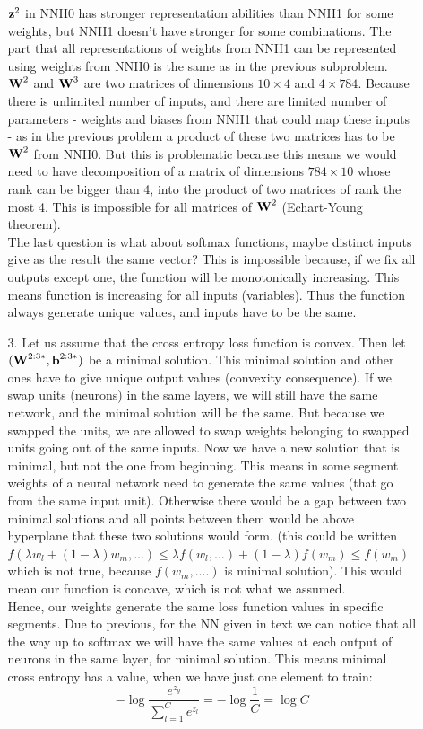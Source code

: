 \documentclass[10pt,a4paper]{article}
\begin{document}
\begin{enumerate}
\begin{enumerate}
$\textbf{\text{{z}}}^2$ in  NNH0 has stronger representation abilities than NNH1 for some weights, but NNH1 doesn't have stronger for some combinations. The part that all representations of weights from NNH1 can be represented using weights from NNH0 is the same as in the previous subproblem.\\
$\textbf{\text{{W}}}^2$ and $\textbf{\text{{W}}}^3$ are two matrices of dimensions $10\times 4$ and $4 \times 784$. Because there is unlimited number of inputs, and there  are limited number of parameters - weights and biases from NNH1 that could map these inputs - as in the previous problem a product of these two matrices has to be $\textbf{\text{{W}}}^2$ from NNH0. But this is problematic because this means we would need to have decomposition of a matrix of dimensions $784\times10$ whose rank can be bigger than 4, into the product of two matrices of rank the most 4. This is impossible for all matrices of $\textbf{\text{{W}}}^2$ (Echart-Young theorem).
\\ The last question is what about softmax functions, maybe distinct inputs give as the result the same vector? This is impossible because, if we fix all outputs except one, the function will be monotonically increasing. This means function is increasing for all inputs (variables). Thus the function always generate unique values, and inputs have to be the same.   
\item[3.]
Let us assume that the cross entropy loss function is convex. Then let $(\textbf{\text{{W}}}^{2:3*}, \textbf{\text{{b}}}^{2:3*})$ be a minimal solution. This minimal solution and other ones have to give unique output values (convexity consequence). 
If we swap units (neurons) in the same layers, we will still have the same network, and the minimal solution will be the same. But because we swapped the units, we are allowed to swap weights belonging to swapped units going out of the same inputs.
Now we have a new solution that is minimal, but not the one from beginning. This means in some segment weights of a neural network need to generate the same values (that go from the same input unit). Otherwise there would be a gap between two minimal solutions and all points between them would be above hyperplane that these two solutions would form. (this could be written $f(\lambda w_l + (1-\lambda )w_m, ...)\leq \lambda f(w_l, ...) + (1-\lambda)f(w_m) \leq f(w_m)$ which is not true, because $f(w_m,....)$ is minimal solution). This would mean our function is concave, which is not what we assumed. 
\\ 
Hence, our weights generate the same loss function values in specific segments. Due to previous, for the NN given in text we can notice that all the way up to softmax we will have the same values at each output of neurons in the same layer, for minimal solution. This means minimal cross entropy has a value, when we have just one element to train: $$-\log \frac{e^{z_y}}{\sum_{l=1}^Ce^{z_l}}=-\log \frac{1}{C} = \log C$$ 

\end{enumerate}
\end{enumerate}
\end{document}
